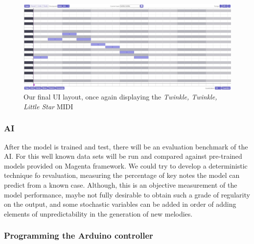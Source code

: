 \begin{figure}[h!]
  \centering
  \includegraphics[width=\linewidth]{image/FinalUI.png}
  \caption{Our final UI layout, once again displaying the \textit{Twinkle, Twinkle, Little Star} MIDI}
  \label{fig:soundtrap}
\end{figure}

\subsubsection{AI}

After the model is trained and test, there will be an evaluation benchmark of the AI. For
this well known data sets will be run and compared against pre-trained models provided on
Magenta framework. We could try to develop a deterministic technique fo revaluation,
measuring the percentage of key notes the model can predict from a known case. Although,
this is an objective measurement of the model performance, maybe not fully desirable to
obtain such a grade of regularity on the output, and some stochastic variables can be
added in order of adding elements of unpredictability in the generation of new melodies.

\subsubsection{Programming the Arduino controller}
